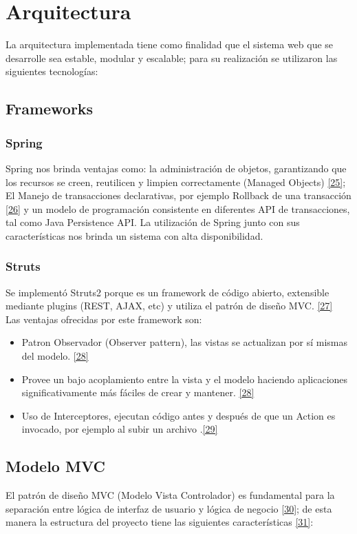 \chapter{Arquitectura} \label{cap:seis}

La arquitectura implementada tiene como finalidad que el sistema web que se desarrolle sea estable, modular y escalable; para su realización se utilizaron las siguientes tecnologías:

\section{Frameworks}
\subsection {Spring}
Spring nos brinda ventajas como: la administración de objetos, garantizando que los recursos se creen, reutilicen y limpien correctamente (Managed Objects) \hyperlink{b25}{[25]}; El Manejo de transacciones declarativas, por ejemplo Rollback de una transacción \hyperlink{b26}{[26]} y un modelo de programación consistente en diferentes API de transacciones, tal como Java Persistence API.
La utilización de Spring junto con sus características nos brinda un sistema con alta disponibilidad.

\subsection {Struts}
Se implementó Struts2 porque es un framework de código abierto, extensible mediante plugins (REST, AJAX, etc) y utiliza el patrón de diseño MVC. \hyperlink{b27}{[27]} \\ 
Las ventajas ofrecidas por este framework son: 

\begin{itemize}
	\item Patron Observador (Observer pattern), las vistas se actualizan por sí mismas del modelo. \hyperlink{b28}{[28]}
	\item Provee un bajo acoplamiento entre la vista y el modelo haciendo aplicaciones significativamente más fáciles de crear y mantener. \hyperlink{b28}{[28]}
	\item Uso de Interceptores, ejecutan código antes y después de que un Action es invocado, por ejemplo al subir un archivo .\hyperlink{b29}{[29]}
\end{itemize}

\section{Modelo MVC}
El patrón de diseño MVC (Modelo Vista Controlador) es fundamental para la separación entre
lógica de interfaz de usuario y lógica de negocio \hyperlink{b30}{[30]}; de esta manera la estructura del proyecto tiene las siguientes características \hyperlink{b31}{[31]}:

